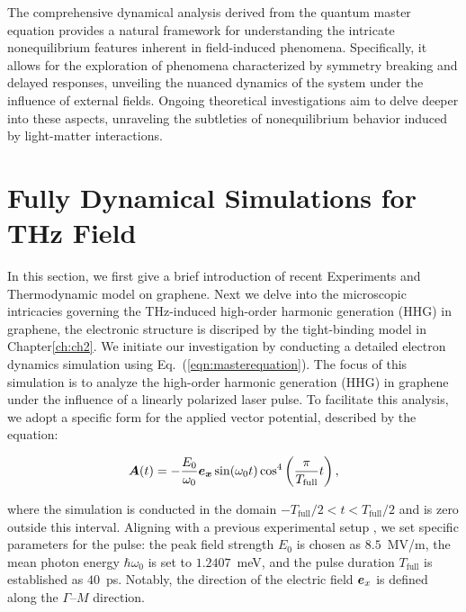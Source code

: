 The comprehensive dynamical analysis derived from the quantum master equation provides a natural framework for understanding the intricate nonequilibrium features inherent in field-induced phenomena. Specifically, it allows for the exploration of phenomena characterized by symmetry breaking and delayed responses, unveiling the nuanced dynamics of the system under the influence of external fields. Ongoing theoretical investigations aim to delve deeper into these aspects, unraveling the subtleties of nonequilibrium behavior induced by light-matter interactions.
\section{Fully Dynamical Simulations for THz Field}

In this section, we first give a brief introduction of recent Experiments and Thermodynamic model on
graphene. Next we delve into the microscopic intricacies governing the THz-induced high-order
harmonic generation (HHG) in graphene, the electronic structure is discriped by the tight-binding
model in Chapter\ref{ch:ch2}. 
We initiate our investigation by conducting a detailed electron dynamics simulation using Eq.~(\ref{eqn:masterequation}). The focus of this simulation is to analyze the high-order harmonic generation (HHG) in graphene under the influence of a linearly polarized laser pulse. To facilitate this analysis, we adopt a specific form for the applied vector potential, described by the equation:

\begin{align}
\boldsymbol A(t) = -\frac{E_0}{\omega_0}\boldsymbol{e_x} \sin(\omega_0 t)\cos^4 \left (\frac{\pi}{T_\mathrm{full}} t \right),
\label{eqn:laser_pulse}
\end{align}

where the simulation is conducted in the domain $-T_\mathrm{full}/2 < t < T_\mathrm{full}/2$ and is zero outside this interval. Aligning with a previous experimental setup \cite{hafez2018extremely}, we set specific parameters for the pulse: the peak field strength $E_0$ is chosen as $8.5$~MV/m, the mean photon energy $\hbar \omega_0$ is set to $1.2407$~meV, and the pulse duration $T_{\mathrm{full}}$ is established as $40$~ps. Notably, the direction of the electric field $\boldsymbol e_x$ is defined along the $\Gamma$--$M$ direction.

